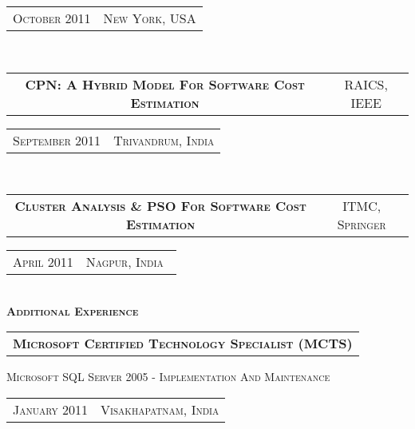\documentclass[10pt,a4paper,oneside]{article}
\begin{document}
    \hspace{1.84in}
    \textcolor{light-gray}{
        \begin{tabular}{c|c}
            {\small O\textsc{ctober 2011}}
            &{\small N\textsc{ew} Y\textsc{ork}, USA}
        \end{tabular}
    } 
    \vspace{-8pt}\\
    \begin{tabular}{c|c}
        \textbf{\normalsize CPN: A H\textsc{ybrid}
        M\textsc{odel} F\textsc{or} S\textsc{oftware}
    C\textsc{ost} E\textsc{stimation}}
        &\textmd{\normalsize RAICS, IEEE}
    \end{tabular}
    \hspace{1.06in}
    \textcolor{light-gray}{
        \begin{tabular}{c|c}
            {\small S\textsc{eptember 2011}}
            &{\small T\textsc{rivandrum}, I\textsc{ndia}}\\
        \end{tabular}
    } 
    \vspace{-8pt}\\
    \begin{tabular}{c|c}
        \textbf{\normalsize C\textsc{luster} A\textsc{nalysis} \& PSO F\textsc{or} S\textsc{oftware} C\textsc{ost} E\textsc{stimation}}
        &\textmd{\normalsize ITMC, S\textsc{pringer}}
    \end{tabular}
    \hspace{1.19in}
    \textcolor{light-gray}{
        \begin{tabular}{c|c}
            {\small A\textsc{pril 2011}}
            &{\small N\textsc{agpur}, I\textsc{ndia}}\
        \end{tabular}
    } 
    \vspace{-6pt}\\
    \textcolor{light-gray}{\textbf{\large A\textsc{dditional} E\textsc{xperience}}}
    \vspace{4pt}\\
    \begin{tabular}{l}
        \textbf{\normalsize M\textsc{icrosoft} C\textsc{ertified} T\textsc{echnology} \textbf{S\textsc{pecialist} (MCTS)}}
    \end{tabular}
    \vspace{2pt}
    \begin{adjustwidth}{7pt}{0pt}
        {\small M\textsc{icrosoft} SQL S\textsc{erver} 2005 - I\textsc{mplementation} A\textsc{nd} M\textsc{aintenance}}
        \hspace{1.57in}
        \textcolor{light-gray}{
        \begin{tabular}{c|c}
            {\small J\textsc{anuary 2011}}
            &{\small V\textsc{isakhapatnam}, I\textsc{ndia}}
        \end{tabular}
    }
    \end{adjustwidth}
\end{document}
